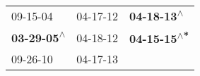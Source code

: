 \begin{supertabular}{lll}
                  09-15-04\textsuperscript{} &  04-17-12\textsuperscript{} &   \textbf{04-18-13\textsuperscript{$\wedge$}} \\
 \textbf{03-29-05\textsuperscript{$\wedge$}} &  04-18-12\textsuperscript{} &  \textbf{04-15-15\textsuperscript{$\wedge$*}} \\
                  09-26-10\textsuperscript{} &  04-17-13\textsuperscript{} &                                               \\
\end{supertabular}
